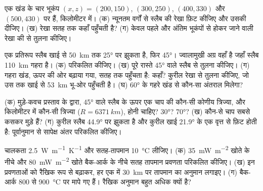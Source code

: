 \begin{exercise}[$\star\star$]\label{exo:b1:active-margins:5}
एक खंड के चार भूकंप $(x, z) = (200, 150)$, $(300, 250)$, $(400, 330)$ और $(500, 430)$ पर हैं, किलोमीटर में। (क) न्यूनतम वर्गों से स्लैब की रेखा फ़िट कीजिए और उसकी  दीजिए। (ख) रेखा सतह तक कहाँ पहुँचती है? (ग) केवल पहले और अंतिम भूकंपों से होकर जाने वाली रेखा की  से तुलना कीजिए।
\end{exercise}

\begin{exercise}[$\star\star$]\label{exo:b1:active-margins:6}
एक प्रतिरूप स्लैब खाई से \qty{50}{km} तक \ang{25}  पर झुकता है, फिर \ang{45}। ज्वालामुखी अग्र वहाँ है जहाँ स्लैब \qty{110}{km} गहरा है। (क)  परिकलित कीजिए। (ख) पूरे रास्ते \ang{45}  वाले स्लैब से तुलना कीजिए। (ग) गहरा खंड, ऊपर की ओर बढ़ाया गया, सतह तक पहुँचता है: कहाँ? कुरील रेखा से तुलना कीजिए, जो उस तक खाई से \qty{53}{km} भू-ओर पहुँचती है। (घ) \ang{60} के गहरे खंड से कौन-सा अंतराल मिलेगा?
\end{exercise}

\begin{exercise}[$\star\star$]\label{exo:b1:active-margins:7}
(क) मुड़े-कवच प्रस्ताव के द्वारा, \ang{45}  वाले स्लैब के ऊपर एक चाप की कौन-सी कोणीय त्रिज्या, और किलोमीटर में कौन-सी त्रिज्या ($R = \qty{6371}{km}$), होनी चाहिए? \ang{30}? \ang{70}? (ख) कौन-से चाप सबसे कसकर मुड़े हैं? (ग) कुरील स्लैब \ang{44.9}  पर झुकता है और कुरील खाई \ang{21.9} के एक वृत्त से फ़िट होती है: पूर्वानुमान से सापेक्ष अंतर परिकलित कीजिए।
\end{exercise}

\begin{exercise}[$\star\star$]\label{exo:b1:active-margins:8}
चालकता \qty{2.5}{W.m^{-1}.K^{-1}} और सतह-तापमान \qty{10}{\celsius} लीजिए। (क) \qty{35}{mW.m^{-2}} खोते  के नीचे और \qty{80}{mW.m^{-2}} खोते बैक-आर्क के नीचे सतह तापमान प्रवणता परिकलित कीजिए। (ख) इन प्रवणताओं को रैखिक रूप से बढ़ाकर, हर एक में \qty{30}{km} पर तापमान का अनुमान लगाइए। (ग) बैक-आर्क  800 से \qty{900}{\celsius} पर मापे गए हैं। रैखिक अनुमान बहुत अधिक क्यों है?
\end{exercise}

